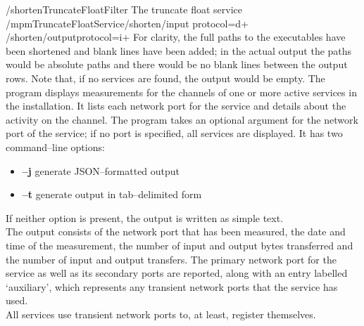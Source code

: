 /shorten\pseudotab{}TruncateFloat\pseudotab{}Filter\pseudotab{}%
The truncate float service\pseudotwotabs\\
\textellipsis/mpmTruncateFloatService\pseudotab{}/shorten/input\textbraceleft{}%
protocol=d+\textbraceright\pseudotab\\
/shorten/output\textbraceleft{}protocol=i+\textbraceright
\outputEnd{}
For clarity, the full paths to the executables have been shortened and blank lines have
been added; in the actual output the paths would be absolute paths and there would be no
blank lines between the output rows.
Note that, if no services are found, the output would be empty.
The program  displays measurements for the channels of one
or more active services in the \mplusm{} installation.
It lists each \yarp{} network port for the service and details about the activity on the
channel.
The program takes an optional argument for the \yarp{} network port of the service; if no
port is specified, all services are displayed.
It has two command--line options:
\begin{itemize}
\item \textbf{--j} generate JSON--formatted output
\item \textbf{--t} generate output in tab--delimited form
\end{itemize}
If neither option is present, the output is written as simple text.\\

The output consists of the \yarp{} network port that has been measured, the date and time
of the measurement, the number of input and output bytes transferred and the number of
input and output transfers.
The primary \yarp{} network port for the service as well as its secondary ports are
reported, along with an entry labelled `auxiliary', which represents any transient
\yarp{} network ports that the service has used.\\

All services use transient \yarp{} network ports to, at least, register themselves.\\


